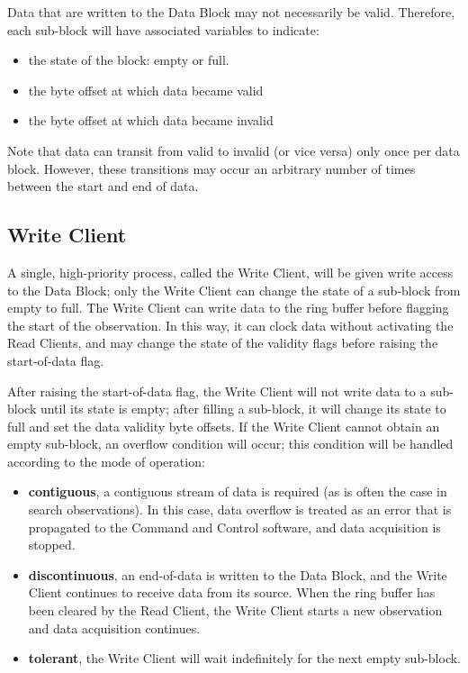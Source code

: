
Data that are written to the Data Block may not necessarily be valid.
Therefore, each sub-block will have associated variables to indicate:
\begin{itemize}
\item the state of the block: empty or full.
\item the byte offset at which data became valid
\item the byte offset at which data became invalid
\end{itemize}
Note that data can transit from valid to invalid (or vice versa) only
once per data block.  However, these transitions may occur an
arbitrary number of times between the start and end of data.

\subsection{Write Client}

A single, high-priority process, called the Write Client, will be
given write access to the Data Block; only the Write Client can change
the state of a sub-block from empty to full.  The Write Client can
write data to the ring buffer before flagging the start of the
observation.  In this way, it can clock data without activating the
Read Clients, and may change the state of the validity flags before
raising the start-of-data flag.

After raising the start-of-data flag, the Write Client will not write
data to a sub-block until its state is empty; after filling a
sub-block, it will change its state to full and set the data validity
byte offsets.  If the Write Client cannot obtain an empty sub-block,
an overflow condition will occur; this condition will be handled
according to the mode of operation:

\begin{itemize}

\item {\bf contiguous}, a contiguous stream of data is required (as is
  often the case in search observations).  In this case, data overflow
  is treated as an error that is propagated to the Command and Control
  software, and data acquisition is stopped.

\item {\bf discontinuous}, an end-of-data is written to the Data
  Block, and the Write Client continues to receive data from its
  source.  When the ring buffer has been cleared by the Read Client,
  the Write Client starts a new observation and data acquisition
  continues.

\item {\bf tolerant}, the Write Client will wait indefinitely for
  the next empty sub-block.

\end{itemize}

